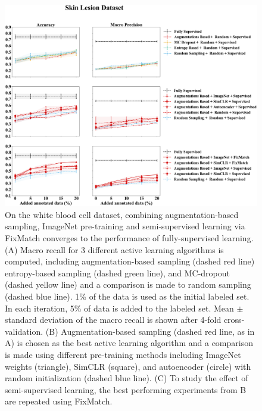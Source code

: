\begin{figure}[htbp]
\centering
\captionsetup{format=plain}
\includegraphics[width=\textwidth]{figures/fig_2_skin_acc_precision.png}
\caption{On the white blood cell dataset, combining augmentation-based sampling, ImageNet pre-training and semi-supervised learning via FixMatch converges to the performance of fully-supervised learning. (A) Macro recall for 3 different active learning algorithms is computed, including augmentation-based sampling (dashed red line) entropy-based sampling (dashed green line), and MC-dropout (dashed yellow line) and a comparison is made to random sampling (dashed blue line). 1\% of the data is used as the initial labeled set. In each iteration, 5\% of data is added to the labeled set. Mean $\pm$ standard deviation of the macro recall is shown after 4-fold cross-validation. (B) Augmentation-based sampling (dashed red line, as in A) is chosen as the best active learning algorithm and a comparison is made using different pre-training methods including ImageNet weights (triangle), SimCLR (square), and autoencoder (circle) with random initialization (dashed blue line). (C) To study the effect of semi-supervised learning, the best performing experiments from B are repeated using FixMatch.}
\label{fig:fig_2_skin_acc_precision}
\end{figure}


